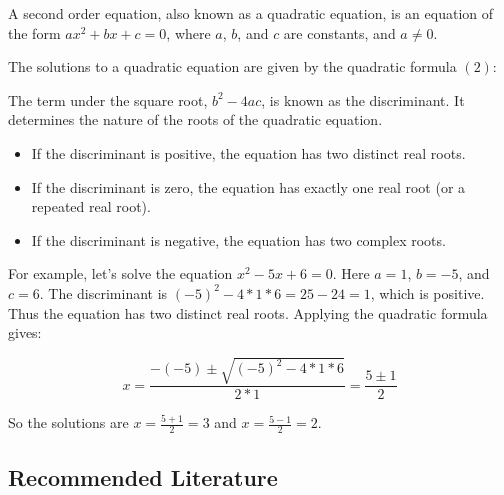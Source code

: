 \documentclass[12pt]{article}
\begin{document}
A second order equation, also known as a quadratic equation, is an equation of the form $ax^2 + bx + c = 0$, where $a$, $b$, and $c$ are constants, and $a \neq 0$. 

The solutions to a quadratic equation are given by the quadratic formula $(2)$:

The term under the square root, $b^2 - 4ac$, is known as the discriminant. It determines the nature of the roots of the quadratic equation.

\begin{itemize}
    \item If the discriminant is positive, the equation has two distinct real roots.
    \item If the discriminant is zero, the equation has exactly one real root (or a repeated real root).
    \item If the discriminant is negative, the equation has two complex roots.
\end{itemize}

For example, let's solve the equation $x^2 - 5x + 6 = 0$. Here $a=1$, $b=-5$, and $c=6$. The discriminant is $(-5)^2 - 4*1*6 = 25 - 24 = 1$, which is positive. Thus the equation has two distinct real roots. Applying the quadratic formula gives:

\[x = \frac{-(-5) \pm \sqrt{(-5)^2 - 4*1*6}}{2*1} = \frac{5 \pm 1}{2}\]

So the solutions are $x = \frac{5 + 1}{2} = 3$ and $x = \frac{5 - 1}{2} = 2$.

\newpage
\subsection*{Recommended Literature}
\end{document}

